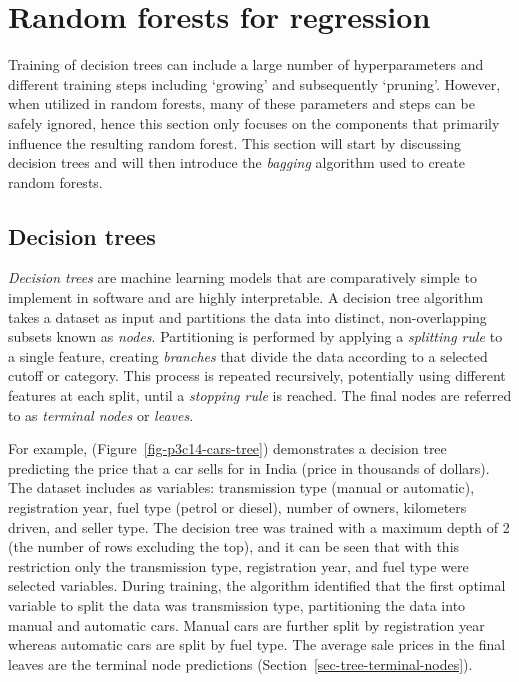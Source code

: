 \documentclass[
  letterpaper,
  krantz2]{style/krantz}
\begin{document}
\section{Random forests for
regression}\label{random-forests-for-regression}

Training of decision trees can include a large number of hyperparameters
and different training steps including `growing' and subsequently
`pruning'. However, when utilized in random
forests, many of these parameters and steps can be safely ignored, hence
this section only focuses on the components that primarily influence the
resulting random forest. This section will start by discussing decision
trees and will then introduce the \emph{bagging} algorithm used to
create random forests.

\subsection{Decision trees}\label{decision-trees}

\emph{Decision trees} are machine learning models that are comparatively
simple to implement in software and are highly
interpretable. A decision tree algorithm takes a
dataset as input and partitions the data into distinct, non-overlapping
subsets known as \emph{nodes}.  Partitioning
is performed by applying a \emph{splitting rule} to a single feature,
creating \emph{branches} that divide the data according to a selected
cutoff or
category.
This process is repeated recursively, potentially using different
features at each split, until a \emph{stopping rule} is reached. The
final nodes are referred to as \emph{terminal nodes} or
\emph{leaves}.

For example, (Figure~\ref{fig-p3c14-cars-tree}) demonstrates a decision
tree predicting the price that a car sells for in
India (price in thousands of dollars). The dataset includes as
variables: transmission type (manual or automatic), registration year,
fuel type (petrol or diesel), number of owners, kilometers driven, and
seller type. The decision tree was trained with a maximum depth of 2
(the number of rows excluding the top), and it can be seen that with
this restriction only the transmission type, registration year, and fuel
type were selected
variables. During
training, the algorithm identified that the first optimal variable to
split the data was transmission type, partitioning the data into manual
and automatic cars. Manual cars are further split by registration year
whereas automatic cars are split by fuel type. The average sale prices
in the final leaves are the terminal node predictions
(Section~\ref{sec-tree-terminal-nodes}).
\end{document}
